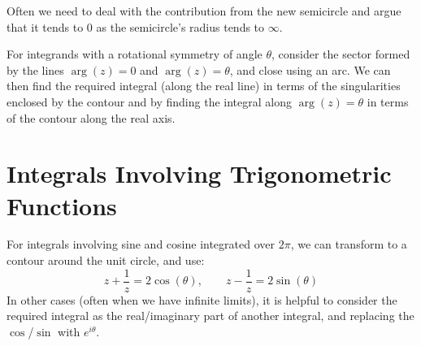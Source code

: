 \documentclass[../Main.tex]{subfiles}
\begin{document}
Often we need to deal with the contribution from the new semicircle and argue that it tends to $0$ as the semicircle's radius tends to $\infty$.

For integrands with a rotational symmetry of angle $\theta$, consider the sector formed by the lines $\arg(z) = 0$ and $\arg(z) = \theta$, and close using an arc. We can then find the required integral (along the real line) in terms of the singularities enclosed by the contour and by finding the integral along $\arg(z) = \theta$ in terms of the contour along the real axis.
\section{Integrals Involving Trigonometric Functions}
For integrals involving sine and cosine integrated over $2\pi$, we can transform to a contour around the unit circle, and use:
\begin{equation*}
    z + \frac1z = 2\cos(\theta),\qquad z - \frac1z = 2\sin(\theta)
\end{equation*}
In other cases (often when we have infinite limits), it is helpful to consider the required integral as the real/imaginary part of another integral, and replacing the $\cos$/$\sin$ with $e^{i\theta}$.
\end{document}
